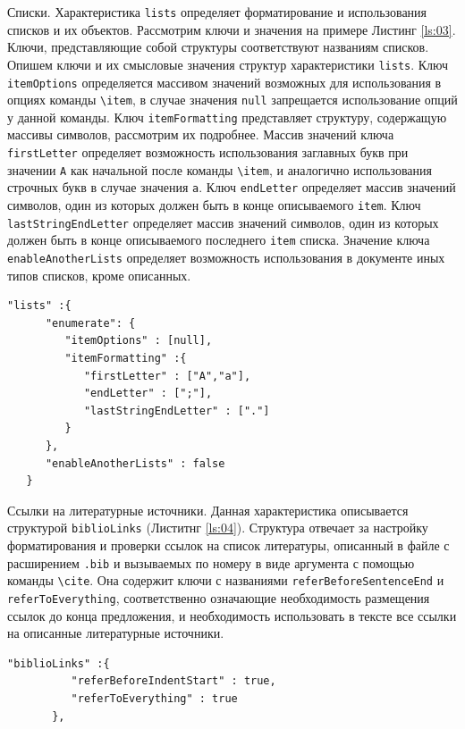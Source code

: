     Списки. Характеристика \verb|lists| определяет форматирование и использования списков и их объектов.  Рассмотрим ключи и значения на примере Листинг \ref{ls:03}. Ключи, представляющие собой структуры соответствуют названиям списков. Опишем ключи и их смысловые значения структур характеристики \verb|lists|. Ключ \verb|itemOptions| определяется массивом значений возможных для использования в опциях команды \verb|\item|, в случае значения \verb|null| запрещается использование опций у данной команды. Ключ \verb|itemFormatting| представляет структуру, содержащую массивы символов, рассмотрим их подробнее. Массив значений ключа \verb|firstLetter| определяет возможность использования заглавных букв при значении \verb|A| как начальной после команды \verb|\item|, и аналогично использования строчных букв в случае значения \verb|a|. Ключ \verb|endLetter| определяет массив значений символов, один из которых должен быть в конце описываемого \verb|item|. Ключ \verb|lastStringEndLetter| определяет массив значений символов, один из которых должен быть в конце описываемого последнего \verb|item| списка. Значение ключа \verb|enableAnotherLists| определяет возможность использования в документе иных типов списков, кроме описанных. 
    \begin{lstlisting}[caption = {Пример конфигурации списков}, label={ls:03}]
    "lists" :{
      "enumerate": {
         "itemOptions" : [null],
         "itemFormatting" :{
            "firstLetter" : ["A","a"],
            "endLetter" : [";"],
            "lastStringEndLetter" : ["."]
         }
      },
      "enableAnotherLists" : false   
   }
    \end{lstlisting}

    Ссылки на литературные источники. Данная характеристика описывается структурой \verb|biblioLinks| (Листитнг \ref{ls:04}). Структура отвечает за настройку форматирования и проверки ссылок на список литературы, описанный в файле с расширением \verb|.bib| и вызываемых по номеру в виде аргумента с помощью команды \verb|\cite|. Она содержит ключи с названиями  \verb|referBeforeSentenceEnd| и \verb|referToEverything|, соответственно означающие необходимость размещения ссылок до конца предложения, и необходимость использовать в тексте все ссылки на описанные литературные источники.
    
    \begin{lstlisting}[caption = {Пример конфигурации ссылок на литературные источники}, label={ls:04}]
    "biblioLinks" :{
          "referBeforeIndentStart" : true,
          "referToEverything" : true
       },
     \end{lstlisting}   

